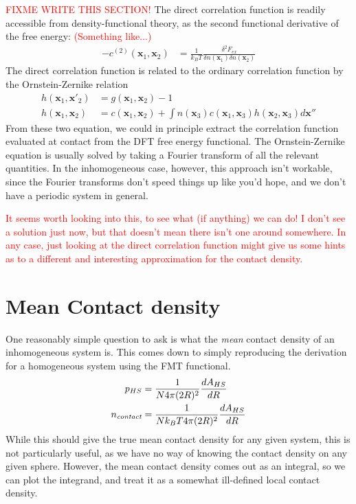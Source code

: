 \documentclass[letterpaper,twocolumn,amsmath,amssymb,prb]{revtex4-1}
\newcommand{\xx}{\textbf{x}}
\newcommand{\derivation}[1]{} %
\begin{document}
\textcolor{red}{FIXME WRITE THIS SECTION!} The direct correlation
function is readily accessible from density-functional theory, as the
second functional derivative of the free energy:
\textcolor{red}{(Something like...)}
\begin{align}
  -c^{(2)}(\xx_1, \xx_2) &= \frac{1}{k_BT}\frac{\delta^2 F_{ex}}{\delta n(\xx_1) \delta n(\xx_2)}
\end{align}
The direct correlation function is related to the ordinary correlation
function by the Ornstein-Zernike relation
\begin{align}
  h(\xx_1, \xx'_2) &= g(\xx_1, \xx_2) - 1 \\
  h(\xx_1, \xx_2) &= c(\xx_1, \xx_2)
    + \int n(\xx_3)c(\xx_1, \xx_3) h(\xx_2, \xx_3)d\xx''
\end{align}
From these two equation, we could in principle extract the correlation
function evaluated at contact from the DFT free energy functional.
The Ornstein-Zernike equation is usually solved by taking a Fourier
transform of all the relevant quantities.  In the inhomogeneous case,
however, this approach isn't workable, since the Fourier transforms
don't speed things up like you'd hope, and we don't have a periodic
system in general.

\textcolor{red}{It seems worth looking into this, to see what (if
  anything) we can do! I don't see a solution just now, but that
  doesn't mean there isn't one around somewhere.  In any case, just
  looking at the direct correlation function might give us some
  hints as to a different and interesting approximation for the
  contact density.}

\derivation{
  \begin{widetext}
}

\section{Mean Contact density}\label{simple-contact}

One reasonably simple question to ask is what the \emph{mean} contact
density of an inhomogeneous system is.  This comes down to simply
reproducing the derivation for a homogeneous system using the
FMT functional.
\begin{align}
  p_{HS} &= \frac{1}{N 4\pi (2R)^2} \frac{dA_{HS}}{dR} \\
  n_\textit{contact} &= \frac{1}{N k_BT 4\pi (2R)^2} \frac{dA_{HS}}{dR}
\end{align}
While this should give the true mean contact density for any given
system, this is not particularly useful, as we have no way of knowing
the contact density on any given sphere.  However, the mean contact
density comes out as an integral, so we can plot the integrand, and
treat it as a somewhat ill-defined local contact density.
\end{document}
